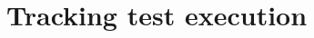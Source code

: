 \hypertarget{group___tracking_test_execution}{
\section{Tracking test execution}
\label{group___tracking_test_execution}
}
